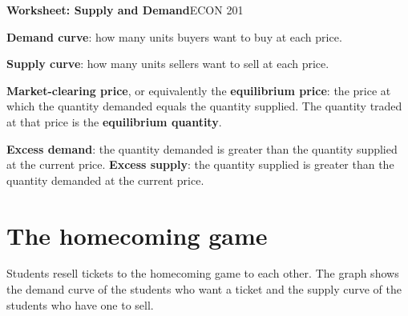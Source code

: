 \documentclass[11pt]{article}
\begin{document}
{\LARGE\bfseries\color{accent} Worksheet: Supply and Demand}\hfill{\large ECON 201}

\newcommand{\term}[1]{\textcolor{accentdark}{\textbf{#1}}}

\newenvironment{deflist}
  {\begin{list}{\textbullet}{%
     \setlength{\leftmargin}{1.1em}\setlength{\labelwidth}{0.7em}%
     \setlength{\labelsep}{0.4em}\setlength{\itemindent}{0pt}%
     \setlength{\listparindent}{0pt}\setlength{\topsep}{2pt}%
     \setlength{\partopsep}{0pt}\setlength{\parsep}{0pt}%
     \setlength{\itemsep}{2pt}}}
  {\end{list}}

\begin{tcolorbox}[colback=cream, colframe=accent, boxrule=0.6pt, arc=2pt,
  left=6pt, right=6pt, top=4pt, bottom=4pt, title=Definitions,
  fonttitle=\bfseries, coltitle=white]
\begin{deflist}
\item \term{Demand curve}: how many units buyers want to buy at each price.
\item \term{Supply curve}: how many units sellers want to sell at each price.
\item \term{Market-clearing price}, or equivalently the \term{equilibrium price}:
  the price at which the quantity demanded equals the quantity supplied. The
  quantity traded at that price is the \term{equilibrium quantity}.
\item \term{Excess demand}: the quantity demanded is greater than the quantity
  supplied at the current price. \term{Excess supply}: the quantity supplied is
  greater than the quantity demanded at the current price.
\end{deflist}
\end{tcolorbox}

\section{The homecoming game}

Students resell tickets to the homecoming game to each other. The graph shows
the demand curve of the students who want a ticket and the supply curve of the
students who have one to sell.
\end{document}
